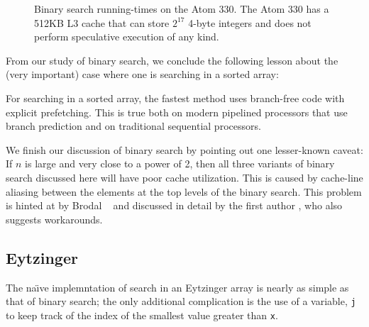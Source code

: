 \documentclass{patmorin}
\begin{document}
\begin{figure}
   \caption{Binary search running-times on the Atom 330. The Atom 330
   has a 512KB L3 cache that can store $2^{17}$ 4-byte integers and does
   not perform speculative execution of any kind.}
\end{figure}

From our study of binary search, we conclude the following lesson about
the (very important) case where one is searching in a sorted array:

\begin{lesson}
  For searching in a sorted array, the fastest method uses branch-free
  code with explicit prefetching.  This is true both on modern pipelined
  processors that use branch prediction and on traditional sequential
  processors.
\end{lesson}

We finish our discussion of binary search by pointing out one lesser-known
caveat:  If $n$ is large and very close to a power of 2, then all three
variants of binary search discussed here will have poor cache utilization.
This is caused by cache-line aliasing between the elements at the top
levels of the binary search.  This problem is hinted at by Brodal \etal\
\cite{X} and discussed in detail by the first author \cite{X}, who also
suggests workarounds.

\subsection{Eytzinger}

The na\"{\i}ve implemntation of search in an Eytzinger array is nearly
as simple as that of binary search; the only additional complication is
the use of a variable, \texttt{j} to keep track of the index
of the smallest value greater than \texttt{x}.

\begin{listing}
\begin{verbatim}
template<typename T, typename I, bool aligned>
I eytzinger_array<T,I,aligned>::_branchy_search(T x) const {
	I i = 0, j = n;
	while (i < n) {
		if (x < a[i]) {
			j = i;
			i = 2*i + 1;
		} else if (x > a[i]) {
			i = 2*i + 2;
		} else {
			return i;
		}
	}
	return j;
}
\end{verbatim}
\caption{A na\"{\i}ve implementation of search in an 
\end{listing}
\end{document}
